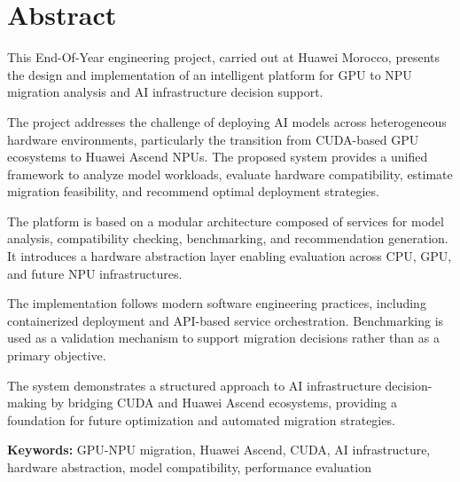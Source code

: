 \chapter*{Abstract}
\label{chap:abstract-en}

This End-Of-Year engineering project, carried out at Huawei Morocco, presents the design and implementation of an intelligent platform for GPU to NPU migration analysis and AI infrastructure decision support.

The project addresses the challenge of deploying AI models across heterogeneous hardware environments, particularly the transition from CUDA-based GPU ecosystems to Huawei Ascend NPUs. The proposed system provides a unified framework to analyze model workloads, evaluate hardware compatibility, estimate migration feasibility, and recommend optimal deployment strategies.

The platform is based on a modular architecture composed of services for model analysis, compatibility checking, benchmarking, and recommendation generation. It introduces a hardware abstraction layer enabling evaluation across CPU, GPU, and future NPU infrastructures.

The implementation follows modern software engineering practices, including containerized deployment and API-based service orchestration. Benchmarking is used as a validation mechanism to support migration decisions rather than as a primary objective.

The system demonstrates a structured approach to AI infrastructure decision-making by bridging CUDA and Huawei Ascend ecosystems, providing a foundation for future optimization and automated migration strategies.

\vspace{0.5cm}
\noindent\textbf{Keywords:} GPU-NPU migration, Huawei Ascend, CUDA, AI infrastructure, hardware abstraction, model compatibility, performance evaluation
